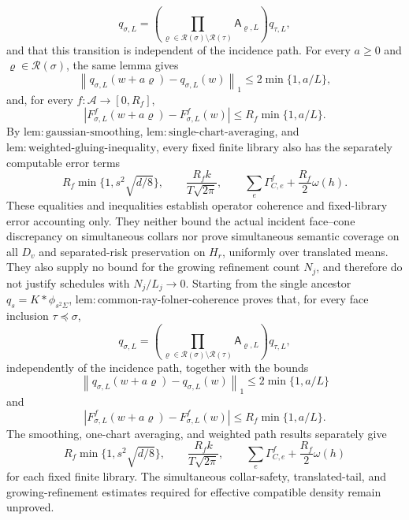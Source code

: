 \[
q_{\sigma,L}
=
\left(
\prod_{\varrho\in\mathscr R(\sigma)\setminus\mathscr R(\tau)}
\mathsf A_{\varrho,L}
\right)q_{\tau,L},
\]
and that this transition is independent of the incidence path.  For every \(a\geq0\) and \(\varrho\in\mathscr R(\sigma)\), the same lemma gives
\[
\left\|q_{\sigma,L}(w+a\varrho)-q_{\sigma,L}(w)\right\|_1
\leq2\min\{1,a/L\},
\]
and, for every \(f:\mathcal A\to[0,R_f]\),
\[
\left|F^f_{\sigma,L}(w+a\varrho)-F^f_{\sigma,L}(w)\right|
\leq R_f\min\{1,a/L\}.
\]
By \(\mathrm{lem:gaussian\mbox{-}smoothing}\), \(\mathrm{lem:single\mbox{-}chart\mbox{-}averaging}\), and \(\mathrm{lem:weighted\mbox{-}gluing\mbox{-}inequality}\), every fixed finite library also has the separately computable error terms
\[
R_f\min\{1,s^2\sqrt{d/8}\},
\qquad
\frac{R_fk}{T\sqrt{2\pi}},
\qquad
\sum_e\Gamma_{C,e}^f+\frac{R_f}{2}\omega(h).
\]
These equalities and inequalities establish operator coherence and fixed-library error accounting only.  They neither bound the actual incident face--cone discrepancy on simultaneous collars nor prove simultaneous semantic coverage on all \(D_v\) and separated-risk preservation on \(H_r\), uniformly over translated means.  They also supply no bound for the growing refinement count \(N_j\), and therefore do not justify schedules with \(N_j/L_j\to0\).
Starting from the single ancestor \(q_s=K*\phi_{s^2\Sigma}\), \(\mathrm{lem:common\mbox{-}ray\mbox{-}folner\mbox{-}coherence}\) proves that, for every face inclusion \(\tau\preceq\sigma\),
\[
q_{\sigma,L}
=
\left(
\prod_{\varrho\in\mathscr R(\sigma)\setminus\mathscr R(\tau)}
\mathsf A_{\varrho,L}
\right)q_{\tau,L},
\]
independently of the incidence path, together with the bounds
\[
\left\|q_{\sigma,L}(w+a\varrho)-q_{\sigma,L}(w)\right\|_1
\leq2\min\{1,a/L\}
\]
and
\[
\left|F^f_{\sigma,L}(w+a\varrho)-F^f_{\sigma,L}(w)\right|
\leq R_f\min\{1,a/L\}.
\]
The smoothing, one-chart averaging, and weighted path results separately give
\[
R_f\min\{1,s^2\sqrt{d/8}\},
\qquad
\frac{R_fk}{T\sqrt{2\pi}},
\qquad
\sum_e\Gamma_{C,e}^f+\frac{R_f}{2}\omega(h)
\]
for each fixed finite library.  The simultaneous collar-safety, translated-tail, and growing-refinement estimates required for effective compatible density remain unproved.
